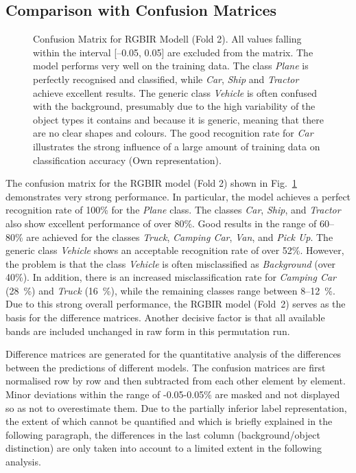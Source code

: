 \FloatBarrier
\subsection*{Comparison with Confusion Matrices}
\label{subsec:permexp_comp_confusion_matric}


\begin{figure}[htbp]
    \centering
    
    \caption[Confusion Matrix for \acrshort{RGBIR} Modell (Fold 2)]{Confusion Matrix for \acrshort{RGBIR} Modell (Fold 2). All values falling within the interval [–0.05, 0.05] are excluded from the matrix. The model performs very well on the training data. The class \textit{Plane} is perfectly recognised and classified, while \textit{Car}, \textit{Ship} and \textit{Tractor} achieve excellent results. The generic class \textit{Vehicle} is often confused with the background, presumably due to the high variability of the object types it contains and because it is generic, meaning that there are no clear shapes and colours. The good recognition rate for \textit{Car} illustrates the strong influence of a large amount of training data on classification accuracy (Own representation).}
    \label{fig:perm_exp_confM_rgbir_f2}
\end{figure}

The confusion matrix for the \acrshort{RGBIR} model (Fold 2) shown in Fig.~\ref{fig:perm_exp_confM_rgbir_f2} demonstrates very strong performance. In particular, the model achieves a perfect recognition rate of 100\% for the \textit{Plane} class. The classes \textit{Car}, \textit{Ship}, and \textit{Tractor} also show excellent performance of over 80\%. Good results in the range of 60–80\% are achieved for the classes \textit{Truck}, \textit{Camping Car}, \textit{Van}, and \textit{Pick Up}. The generic class \textit{Vehicle} shows an acceptable recognition rate of over 52\%. However, the problem is that the class \textit{Vehicle} is often misclassified as \textit{Background} (over 40\%). In addition, there is an increased misclassification rate for \textit{Camping Car} (28~\%) and \textit{Truck} (16~\%), while the remaining classes range between 8–12~\%. Due to this strong overall performance, the \acrshort{RGBIR} model (Fold~2) serves as the basis for the difference matrices. Another decisive factor is that all available bands are included unchanged in raw form in this permutation run.

Difference matrices are generated for the quantitative analysis of the differences between the predictions of different models. The confusion matrices are first normalised row by row and then subtracted from each other element by element. Minor deviations within the range of -0.05-0.05\% are masked and not displayed so as not to overestimate them. Due to the partially inferior label representation, the extent of which cannot be quantified and which is briefly explained in the following paragraph, the differences in the last column (background/object distinction) are only taken into account to a limited extent in the following analysis.

